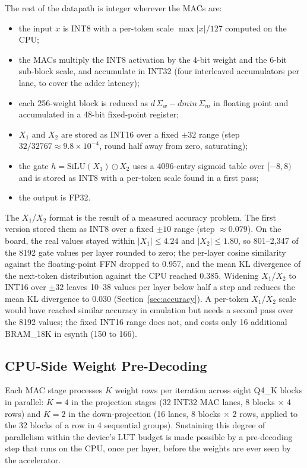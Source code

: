 The rest of the datapath is integer wherever the MACs are:
\begin{itemize}
    \item the input $x$ is INT8 with a per-token scale $\max|x|/127$ computed on the CPU;
    \item the MACs multiply the INT8 activation by the 4-bit weight and the 6-bit
    sub-block scale, and accumulate in INT32 (four interleaved accumulators per lane, to
    cover the adder latency);
    \item each 256-weight block is reduced as $d\,\Sigma_w - dmin\,\Sigma_m$ in floating
    point and accumulated in a 48-bit fixed-point register;
    \item $X_1$ and $X_2$ are stored as INT16 over a fixed $\pm32$ range (step
    $32/32767 \approx 9.8\times10^{-4}$, round half away from zero, saturating);
    \item the gate $h = \text{SiLU}(X_1)\odot X_2$ uses a 4096-entry sigmoid table over
    $[-8, 8)$ and is stored as INT8 with a per-token scale found in a first pass;
    \item the output is FP32.
\end{itemize}

The $X_1$/$X_2$ format is the result of a measured accuracy problem. The first version
stored them as INT8 over a fixed $\pm10$ range (step $\approx 0.079$). On the board, the
real values stayed within $|X_1|\le4.24$ and $|X_2|\le1.80$, so 801--2,347 of the 8192
gate values per layer rounded to zero; the per-layer cosine similarity against the
floating-point FFN dropped to 0.957, and the mean KL divergence of the next-token
distribution against the CPU reached 0.385. Widening $X_1$/$X_2$ to INT16 over $\pm32$
leaves 10--38 values per layer below half a step and reduces the mean KL divergence to
0.030 (Section~\ref{sec:accuracy}). A per-token $X_1$/$X_2$ scale would have reached
similar accuracy in emulation but needs a second pass over the 8192 values; the
fixed INT16 range does not, and costs only 16 additional BRAM\_18K in csynth (150 to
166).

\subsection{CPU-Side Weight Pre-Decoding}
\label{subsec:predecode}

Each MAC stage processes $K$ weight rows per iteration across eight Q4\_K blocks in
parallel: $K=4$ in the projection stages (32 INT32 MAC lanes, 8 blocks $\times$ 4 rows)
and $K=2$ in the down-projection (16 lanes, 8 blocks $\times$ 2 rows, applied to the 32
blocks of a row in 4 sequential groups). Sustaining this degree of parallelism within the
device's LUT budget is made possible by a pre-decoding step that runs on the CPU, once
per layer, before the weights are ever seen by the accelerator.

